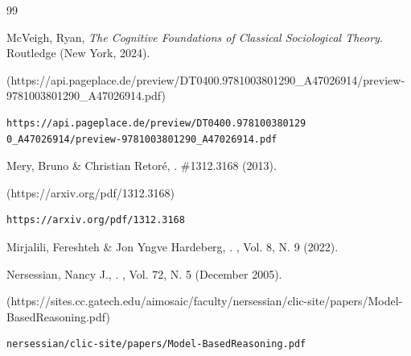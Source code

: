 \begin{thebibliography}{99}
{\begin{bItem}[RyanMcVeigh]
McVeigh, Ryan,
\textit{The Cognitive Foundations of Classical Sociological Theory}.
Routledge (New York, 2024).
%
\begin{boxurl}(https://api.pageplace.de/preview/DT0400.9781003801290_A47026914/preview-9781003801290_A47026914.pdf)
\begin{lstlisting}
https://api.pageplace.de/preview/DT0400.978100380129
0_A47026914/preview-9781003801290_A47026914.pdf
\end{lstlisting}
\end{boxurl}\end{bItem}





\begin{bItem}[MeryRetore]
Mery, Bruno \& Christian Retor\'e,
.
 \#1312.3168 (2013). 
%
\begin{boxurl}(https://arxiv.org/pdf/1312.3168)
\begin{lstlisting}
https://arxiv.org/pdf/1312.3168
\end{lstlisting}
\end{boxurl}\end{bItem}


\begin{bItem}[MirjaliliHardeberg]
Mirjalili, Fereshteh \& Jon Yngve Hardeberg,
.
, Vol. 8, N. 9 (2022).
%
\end{bItem}





\begin{bItem}[NancyJNersessian]
Nersessian, Nancy J.,%
{}.
,
Vol. 72, N. 5 (December 2005). 
%
\begin{boxurl}(https://sites.cc.gatech.edu/aimosaic/faculty/nersessian/clic-site/papers/Model-BasedReasoning.pdf)
\begin{lstlisting}
nersessian/clic-site/papers/Model-BasedReasoning.pdf
\end{lstlisting}
\end{boxurl}\end{bItem}




}
\end{thebibliography}
